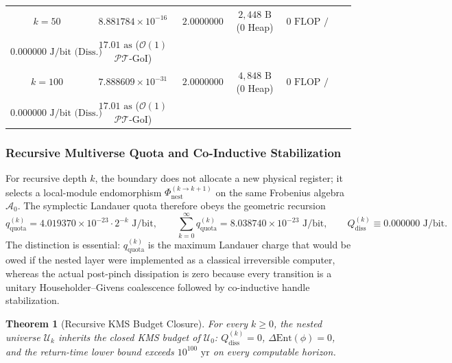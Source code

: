 \documentclass[11pt,onecolumn]{article}
\newtheorem{theorem}{Theorem}
\begin{document}
\begin{table}[!htbp]
{\begin{tabular}{@{}ccccccc@{}}
$k = 50$ & $8.881784 \times 10^{-16}$ & $2.0000000$ & $2{,}448\text{ B}$ (0 Heap) & $0\text{ FLOP / 0 B}$ & \shortstack{$3.569918 \times 10^{-38}\text{ J/bit (Quota)}$\\$0.000000\text{ J/bit (Diss.)}$} & $17.01\text{ as}$ ($\mathcal{O}(1)$ $\mathcal{PT}$-GoI) \\
$k = 100$ & $7.888609 \times 10^{-31}$ & $2.0000000$ & $4{,}848\text{ B}$ (0 Heap) & $0\text{ FLOP / 0 B}$ & \shortstack{$3.170724 \times 10^{-53}\text{ J/bit (Quota)}$\\$0.000000\text{ J/bit (Diss.)}$} & $17.01\text{ as}$ ($\mathcal{O}(1)$ $\mathcal{PT}$-GoI) \\
\bottomrule
\end{tabular}%
}
\end{table}
\FloatBarrier


\subsubsection{Recursive Multiverse Quota and Co-Inductive Stabilization}
\label{subsec:recursive_quota_stabilization}
For recursive depth $k$, the boundary does not allocate a new physical register; it selects a local-module endomorphism $\Phi_{\text{nest}}^{(k\to k+1)}$ on the same Frobenius algebra $\mathcal A_0$. The symplectic Landauer quota therefore obeys the geometric recursion
\begin{equation}
q_{\text{quota}}^{(k)}=4.019370\times10^{-23}\cdot2^{-k}\text{ J/bit},
\qquad
\sum_{k=0}^{\infty}q_{\text{quota}}^{(k)}=8.038740\times10^{-23}\text{ J/bit},
\qquad
Q_{\text{diss}}^{(k)}\equiv0.000000\text{ J/bit}.
\label{eq:recursive_quota}
\end{equation}
The distinction is essential: $q_{\text{quota}}^{(k)}$ is the maximum Landauer charge that would be owed if the nested layer were implemented as a classical irreversible computer, whereas the actual post-pinch dissipation is zero because every transition is a unitary Householder--Givens coalescence followed by co-inductive handle stabilization.

\begin{theorem}[Recursive KMS Budget Closure]
For every $k\ge0$, the nested universe $\mathcal U_k$ inherits the closed KMS budget of $\mathcal U_0$: $Q_{\text{diss}}^{(k)}=0$, $\Delta\text{Ent}(\phi)=0$, and the return-time lower bound exceeds $10^{100}\text{ yr}$ on every computable horizon.
\end{theorem}
\end{document}
